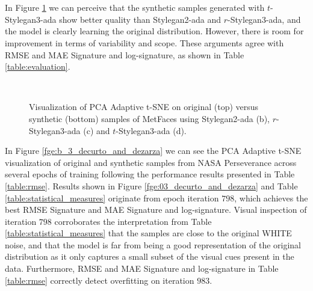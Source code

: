 \documentclass[lettersize,journal]{IEEEtran}
\begin{document}
\begin{figure*}[ht]
\centering
{}
\\
\\
\caption{Visualization of PCA Adaptive t-SNE on original (left) versus synthetic (right) samples of AFHQ Cat (a,b), Dog (c,d) and Wild (e,f) using Stylegan2-ada.}
\label{fge:b_decurto_and_dezarza}
\end{figure*}

In Figure \ref{fge:b_2_decurto_and_dezarza} we can perceive that the synthetic samples generated with $t$-Stylegan3-ada show better quality than Stylegan2-ada and $r$-Stylegan3-ada, and the model is clearly learning the original distribution. However, there is room for improvement in terms of variability and scope. These arguments agree with RMSE and MAE Signature and log-signature, as shown in Table \ref{table:evaluation}. 

\begin{figure}[ht]
\centering
{}\\
\caption{Visualization of PCA Adaptive t-SNE on original (top) versus synthetic (bottom) samples of MetFaces using Stylegan2-ada (b), $r$-Stylegan3-ada (c) and $t$-Stylegan3-ada (d).}
\label{fge:b_2_decurto_and_dezarza}
\end{figure}

In Figure \ref{fge:b_3_decurto_and_dezarza} we can see the PCA Adaptive t-SNE visualization of original and synthetic samples from NASA Perseverance across several epochs of training following the performance results presented in Table \ref{table:rmse}. Results shown in Figure \ref{fge:03_decurto_and_dezarza} and Table \ref{table:statistical_measures} originate from epoch iteration $798$, which achieves the best RMSE Signature and MAE Signature and log-signature. Visual inspection of iteration $798$ corroborates the interpretation from Table \ref{table:statistical_measures} that the samples are close to the original WHITE noise, and that the model is far from being a good representation of the original distribution as it only captures a small subset of the visual cues present in the data. Furthermore, RMSE and MAE Signature and log-signature in Table \ref{table:rmse} correctly detect overfitting on iteration $983$.
\end{document}
